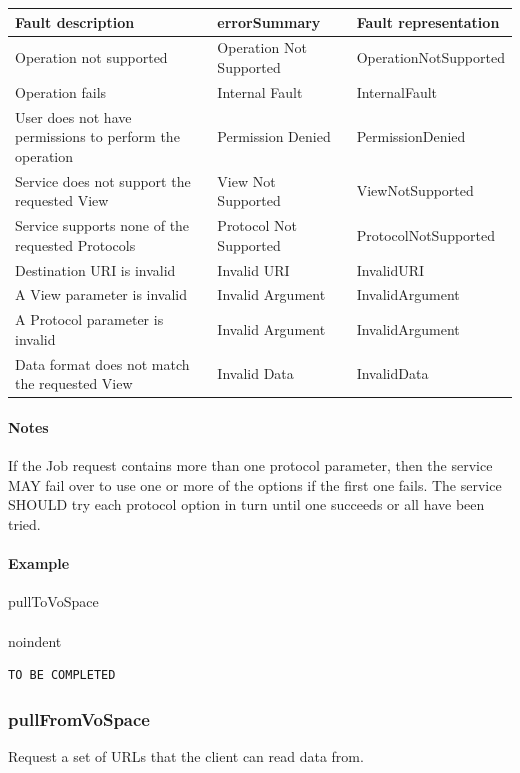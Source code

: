 \documentclass[11pt,a4paper]{ivoa}
\begin{document}
\vspace{3mm}
\begin{tabular}{ p{5cm} l p{4cm} }
\textbf{Fault description} & \textbf{errorSummary} & \textbf{Fault representation} \\
\hline
Operation not supported & Operation Not Supported & OperationNotSupported \\
\hline
Operation fails & Internal Fault & InternalFault \\
\hline
User does not have permissions to perform the operation & Permission Denied & PermissionDenied \\
\hline
Service does not support the requested View & View Not Supported & ViewNotSupported \\
\hline
Service supports none of the requested Protocols & Protocol Not Supported &ProtocolNotSupported \\
\hline
Destination URI is invalid & Invalid URI & InvalidURI \\
\hline
A View parameter is invalid & Invalid Argument & InvalidArgument \\
\hline
A Protocol parameter is invalid & Invalid Argument & InvalidArgument \\
\hline
Data format does not match the requested View & Invalid Data & InvalidData \\
\hline
\end{tabular}
\vspace{3mm}

\paragraph{Notes}
If the Job request contains more than one protocol parameter, then the service MAY fail over to use one or more of the options if the first one fails. The service SHOULD try each protocol option in turn until one succeeds or all have been tried.

\paragraph{Example}
pullToVoSpace
\\[5px]
\\noindent
\begin{lstlisting}
TO BE COMPLETED
\end{lstlisting}

\subsubsection{pullFromVoSpace}
\label{subsubsec:pullfromvospace}
Request a set of URLs that the client can read data from.
\end{document}
